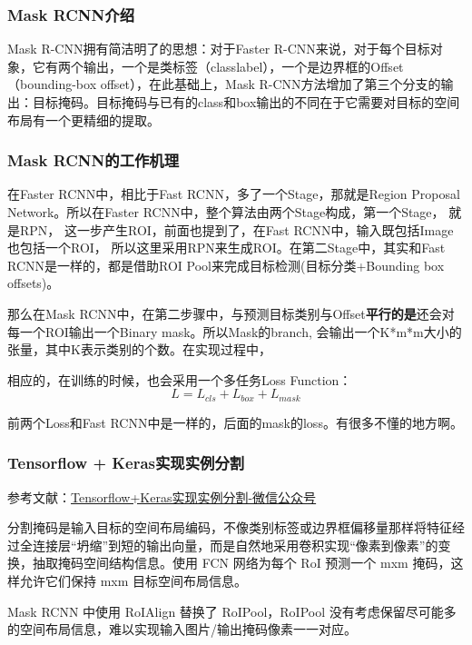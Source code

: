 \subsubsection{Mask RCNN介绍}
Mask R-CNN拥有简洁明了的思想：对于Faster R-CNN来说，对于每个目标对象，它有两个输出，一个是类标签（classlabel），一个是边界框的Offset（bounding-box offset），在此基础上，Mask R-CNN方法增加了第三个分支的输出：目标掩码。目标掩码与已有的class和box输出的不同在于它需要对目标的空间布局有一个更精细的提取。

\subsubsection{Mask RCNN的工作机理}

在Faster RCNN中，相比于Fast RCNN，多了一个Stage，那就是Region Proposal Network。所以在Faster RCNN中，整个算法由两个Stage构成，第一个Stage， 就是RPN， 这一步产生ROI，前面也提到了，在Fast RCNN中，输入既包括Image也包括一个ROI， 所以这里采用RPN来生成ROI。在第二Stage中，其实和Fast RCNN是一样的，都是借助ROI Pool来完成目标检测(目标分类+Bounding box offsets)。

那么在Mask RCNN中，在第二步骤中，与预测目标类别与Offset\textbf{平行的是}还会对每一个ROI输出一个Binary mask。所以Mask的branch, 会输出一个K*m*m大小的张量，其中K表示类别的个数。在实现过程中，

相应的，在训练的时候，也会采用一个多任务Loss Function：
\begin{displaymath}
L = L_{cls} + L_{box} + L_{mask}
\end{displaymath}

前两个Loss和Fast RCNN中是一样的，后面的mask的loss。有很多不懂的地方啊。

\subsubsection{Tensorflow + Keras实现实例分割}

参考文献：\href{https://mp.weixin.qq.com/s/Fo1yd6W1EdCQGEflP26tHA}{Tensorflow+Keras实现实例分割-微信公众号}

分割掩码是输入目标的空间布局编码，不像类别标签或边界框偏移量那样将特征经过全连接层“坍缩”到短的输出向量，而是自然地采用卷积实现“像素到像素”的变换，抽取掩码空间结构信息。使用 FCN 网络为每个 RoI 预测一个 mxm 掩码，这样允许它们保持 mxm 目标空间布局信息。

Mask RCNN 中使用 RoIAlign 替换了 RoIPool，RoIPool 没有考虑保留尽可能多的空间布局信息，难以实现输入图片/输出掩码像素一一对应。


